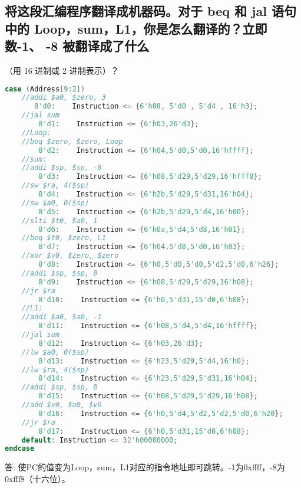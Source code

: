 \documentclass{ctexart}
\begin{document}
    \subsection{ 将这段汇编程序翻译成机器码。对于 beq 和 jal 语句中的 Loop，sum，L1，你是怎么翻译的？立即数-1、 -8 被翻译成了什么}
（用 16 进制或 2 进制表示）？
        \begin{lstlisting}[language=verilog]
case (Address[9:2])
    //addi $a0, $zero, 3
       8'd0:    Instruction <= {6'h08, 5'd0 , 5'd4 , 16'h3};
    //jal sum
        8'd1:    Instruction <= {6'h03,26'd3};
    //Loop:
    //beq $zero, $zero, Loop
        8'd2:    Instruction <= {6'h04,5'd0,5'd0,16'hffff};
    //sum:
    //addi $sp, $sp, -8
        8'd3:    Instruction <= {6'h08,5'd29,5'd29,16'hfff8};
    //sw $ra, 4($sp)
        8'd4:    Instruction <= {6'h2b,5'd29,5'd31,16'h04};
    //sw $a0, 0($sp)
        8'd5:    Instruction <= {6'h2b,5'd29,5'd4,16'h00};
    //slti $t0, $a0, 1
        8'd6:    Instruction <= {6'h0a,5'd4,5'd8,16'h01};
    //beq $t0, $zero, L1
        8'd7:    Instruction <= {6'h04,5'd8,5'd0,16'h03};
    //xor $v0, $zero, $zero
        8'd8:    Instruction <= {6'h0,5'd0,5'd0,5'd2,5'd0,6'h26};
    //addi $sp, $sp, 8
        8'd9:    Instruction <= {6'h08,5'd29,5'd29,16'h08};
    //jr $ra
        8'd10:    Instruction <= {6'h0,5'd31,15'd0,6'h08};
    //L1:
    //addi $a0, $a0, -1
        8'd11:    Instruction <= {6'h08,5'd4,5'd4,16'hffff};
    //jal sum
        8'd12:    Instruction <= {6'h03,26'd3};
    //lw $a0, 0($sp)
        8'd13:    Instruction <= {6'h23,5'd29,5'd4,16'h0};
    //lw $ra, 4($sp)
        8'd14:    Instruction <= {6'h23,5'd29,5'd31,16'h04};
    //addi $sp, $sp, 8
        8'd15:    Instruction <= {6'h08,5'd29,5'd29,16'h08};
    //add $v0, $a0, $v0
        8'd16:    Instruction <= {6'h0,5'd4,5'd2,5'd2,5'd0,6'h20};
    //jr $ra
        8'd17:    Instruction <= {6'h0,5'd31,15'd0,6'h08};
   	default: Instruction <= 32'h00000000;
endcase 
        \end{lstlisting}

       答: 使PC的值变为Loop，sum，L1对应的指令地址即可跳转。-1为0xffff，-8为0xfff8（十六位）。
\end{document}
